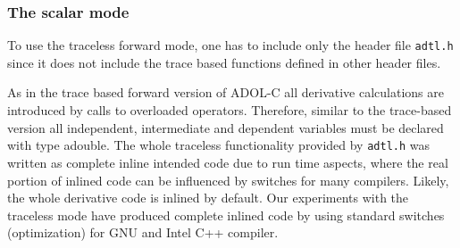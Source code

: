 \documentclass[11pt,twoside]{article}
\begin{document}
\subsubsection*{The scalar mode}
%
To use the traceless forward mode, one has to include only
the header file \verb#adtl.h# since it does not include the
trace based functions defined in other header files. 

As in the trace based forward version of ADOL-C all derivative
calculations are introduced by calls to overloaded
operators. Therefore, similar to the trace-based version all
independent, intermediate and dependent variables must be declared 
with type {\sf adouble}. The whole traceless functionality provided by
\verb#adtl.h# was written as complete inline intended code
due to run time aspects, where the real portion of inlined code can
be influenced by switches for many compilers. Likely, the whole
derivative code is inlined by default. Our experiments
with the traceless mode have produced complete inlined code by using
standard switches (optimization) for GNU and Intel C++
compiler.
\end{document}
